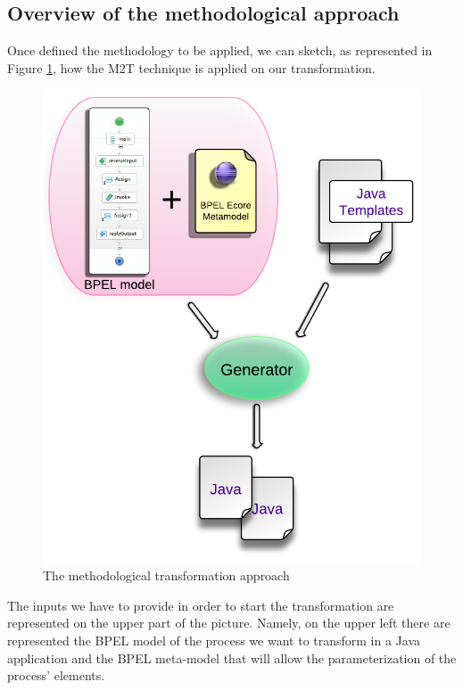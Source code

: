 \subsection{Overview of the methodological approach}
\label{MethodologyOverview}
Once defined the methodology to be applied, we can sketch, as represented in Figure \ref{fig:TransformationApproach}, how the M2T technique is applied on our transformation.
\begin{figure}[ht]
  \begin{center}
    \includegraphics[scale=0.9]{pictures/TransformationApproach.png}
    \caption{The methodological transformation approach}
    \label{fig:TransformationApproach}
  \end{center}
\end{figure}
The inputs we have to provide in order to start the transformation are represented on the upper part of the picture. Namely, on the upper left there are represented the BPEL model of the process we want to transform in a Java application and the BPEL meta-model that will allow the parameterization of the process' elements. 
